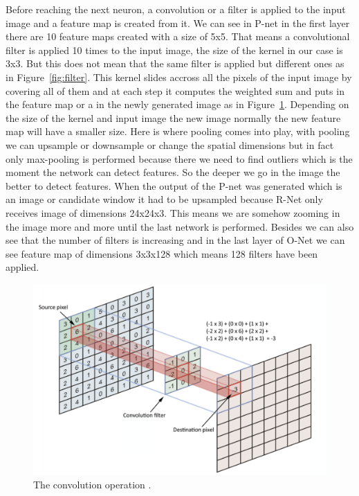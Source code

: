 Before reaching the next neuron, a convolution or a filter is applied to the input image and a feature map is created from it. We can see in P-net in the first layer there are 10 feature maps created with a size of 5x5. That means a convolutional filter is applied 10 times to the input image, the size of the kernel in our case is 3x3. But this does not mean that the same filter is applied but different ones as in Figure~\ref{fig:filter}. This kernel slides accross all the pixels of the input image by covering all of them and at each step it computes the weighted sum and puts in the feature map or a in the newly generated image as in Figure~\ref{fig:conv}. Depending on the size of the kernel and input image the new image normally the new feature map will have a smaller size. Here is where pooling comes into play, with pooling we can upsample or downsample or change the spatial dimensions but in fact only max-pooling is performed because there we need to find outliers which is the moment the network can detect features. So the deeper we go in the image the better to detect features. When the output of the P-net was generated which is an image or candidate window it had to be upsampled because R-Net only receives image of dimensions 24x24x3. This means we are somehow zooming in the image more and more until the last network is performed. Besides we can also see that the number of filters is increasing and in the last layer of O-Net we can see feature map of dimensions 3x3x128 which means 128 filters have been applied. 
\begin{figure}[!htb]
    \centering
    \includegraphics[width=1\textwidth]{figures/convolution.png}
    \caption{The convolution operation \cite{simpleconvolution}.}
    \label{fig:conv}
\end{figure}


